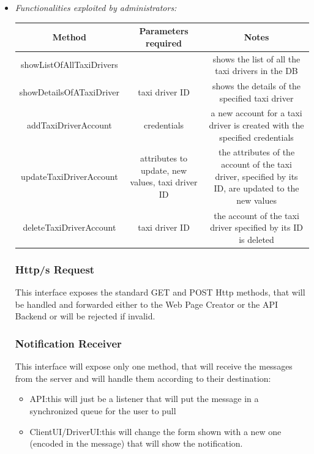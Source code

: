 \documentclass{article}
\begin{document}
\begin{itemize}
\begin{table}[H]
\begin{adjustbox}{width=1.2\textwidth}
\begin{tabular}{*{3}{c}}
					\bottomrule
				\end{tabular}
			\end{adjustbox}
		\end{table}		
		\item \textit{Functionalities exploited by administrators:} \\
		\begin{table}[H]
			\begin{adjustbox}{width=1.2\textwidth}	
				\begin{tabular}{*{3}{c}}
					\toprule
					Method & Parameters required & Notes \\
					\midrule
					showListOfAllTaxiDrivers & & shows the list of all the taxi drivers in the DB\\
					showDetailsOfATaxiDriver & taxi driver ID & shows the details of the specified taxi driver\\
					addTaxiDriverAccount & credentials & a new account for a taxi driver is created with the specified credentials\\ 
					updateTaxiDriverAccount & attributes to update, new values, taxi driver ID & the attributes of the account of the taxi driver, specified by its ID, are updated to the new values\\ 
					deleteTaxiDriverAccount & taxi driver ID & the account of the taxi driver specified by its ID is deleted\\
					\bottomrule
				\end{tabular}
			\end{adjustbox}	
		\end{table}	
		\subsubsection{Http/s Request} 
		This interface exposes the standard GET and POST Http methods, that will be handled and forwarded either to the Web Page Creator or the API Backend or will be rejected if invalid.
		\subsubsection{Notification Receiver}
		This interface will expose only one method, that will receive the messages from the server and will handle them according to their destination: 
		\begin{itemize}
			\item API:\@ this will just be a listener that will put the message in a synchronized queue for the user to pull
			\item ClientUI/DriverUI:\@ this will change the form shown with a new one (encoded in the message) that will show the notification. 
		\end{itemize}
		

\end{itemize}
\end{document}
